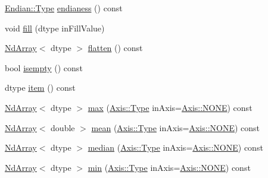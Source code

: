 \begin{DoxyCompactItemize}
\item 
\mbox{\hyperlink{struct_num_cpp_1_1_endian_a4b4f3e02f68302be202402f5d5501445}{Endian\+::\+Type}} \mbox{\hyperlink{class_num_cpp_1_1_nd_array_a993056fafbb30dbbab8957496a5226be}{endianess}} () const
\item 
void \mbox{\hyperlink{class_num_cpp_1_1_nd_array_abe38a848fb5280ef2d091168ff3d4a57}{fill}} (dtype in\+Fill\+Value)
\item 
\mbox{\hyperlink{class_num_cpp_1_1_nd_array}{Nd\+Array}}$<$ dtype $>$ \mbox{\hyperlink{class_num_cpp_1_1_nd_array_aaf835c0f1977dda3fa78ae69fe8b0a7b}{flatten}} () const
\item 
bool \mbox{\hyperlink{class_num_cpp_1_1_nd_array_ae1b8560fe448e702b51b83b6e3a5c844}{isempty}} () const
\item 
dtype \mbox{\hyperlink{class_num_cpp_1_1_nd_array_af5d55944e1693657135b30972f658f2f}{item}} () const
\item 
\mbox{\hyperlink{class_num_cpp_1_1_nd_array}{Nd\+Array}}$<$ dtype $>$ \mbox{\hyperlink{class_num_cpp_1_1_nd_array_a19eaac821a5ce6f9293189d9648e10d0}{max}} (\mbox{\hyperlink{struct_num_cpp_1_1_axis_ac10eb76f8631762d9ed70c40c42ca6cb}{Axis\+::\+Type}} in\+Axis=\mbox{\hyperlink{struct_num_cpp_1_1_axis_ac10eb76f8631762d9ed70c40c42ca6cba747ae657022cca1d87702b56d0c038e9}{Axis\+::\+N\+O\+NE}}) const
\item 
\mbox{\hyperlink{class_num_cpp_1_1_nd_array}{Nd\+Array}}$<$ double $>$ \mbox{\hyperlink{class_num_cpp_1_1_nd_array_a8c5037810903a59d43d59e9056217191}{mean}} (\mbox{\hyperlink{struct_num_cpp_1_1_axis_ac10eb76f8631762d9ed70c40c42ca6cb}{Axis\+::\+Type}} in\+Axis=\mbox{\hyperlink{struct_num_cpp_1_1_axis_ac10eb76f8631762d9ed70c40c42ca6cba747ae657022cca1d87702b56d0c038e9}{Axis\+::\+N\+O\+NE}}) const
\item 
\mbox{\hyperlink{class_num_cpp_1_1_nd_array}{Nd\+Array}}$<$ dtype $>$ \mbox{\hyperlink{class_num_cpp_1_1_nd_array_a9ca8e600d47e4e95bc233798c5f139d2}{median}} (\mbox{\hyperlink{struct_num_cpp_1_1_axis_ac10eb76f8631762d9ed70c40c42ca6cb}{Axis\+::\+Type}} in\+Axis=\mbox{\hyperlink{struct_num_cpp_1_1_axis_ac10eb76f8631762d9ed70c40c42ca6cba747ae657022cca1d87702b56d0c038e9}{Axis\+::\+N\+O\+NE}}) const
\item 
\mbox{\hyperlink{class_num_cpp_1_1_nd_array}{Nd\+Array}}$<$ dtype $>$ \mbox{\hyperlink{class_num_cpp_1_1_nd_array_a73200d9c70104cc8779916b426e2b3bb}{min}} (\mbox{\hyperlink{struct_num_cpp_1_1_axis_ac10eb76f8631762d9ed70c40c42ca6cb}{Axis\+::\+Type}} in\+Axis=\mbox{\hyperlink{struct_num_cpp_1_1_axis_ac10eb76f8631762d9ed70c40c42ca6cba747ae657022cca1d87702b56d0c038e9}{Axis\+::\+N\+O\+NE}}) const

\end{DoxyCompactItemize}
